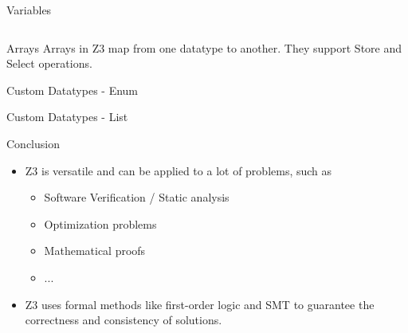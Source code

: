 \documentclass{beamer}
\begin{document}
\begin{frame}{Variables}
	
\begin{columns}
	\begin{column}{0.4\textwidth}
			
	\end{column}
	\begin{column}{0.6\textwidth}
			
		
	\end{column}
	
\end{columns}


\end{frame}

\begin{frame}{Arrays}
	Arrays in Z3 map from one datatype to another. They support Store and Select operations.
	
	
\end{frame}

\begin{frame}{Custom Datatypes - Enum}
	
\end{frame}


\begin{frame}{Custom Datatypes - List}
	
\end{frame}


\begin{frame}{Conclusion}
\begin{itemize}
	\item Z3 is versatile and can be applied to a lot of problems, such as 
	\begin{itemize}
		\item Software Verification / Static analysis
		\item Optimization problems
		\item Mathematical proofs
		\item ...
	\end{itemize}
	\item Z3 uses formal methods like first-order logic and SMT to guarantee the correctness and consistency of solutions.
\end{itemize}
\end{frame}
\end{document}
